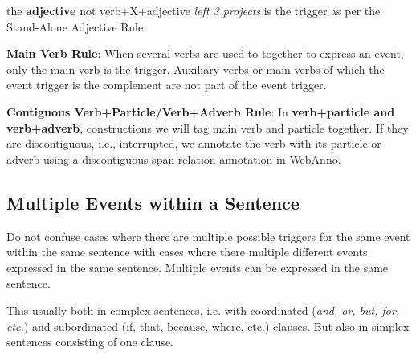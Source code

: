 \begin{exe}
    \ex {}
        \expl the \textbf{adjective}  not verb+X+adjective \textit{left 3 projects} is the trigger as per the Stand-Alone Adjective Rule.
\end{exe}

\noindent\textbf{Main Verb Rule}: When several verbs are used to together to express an event, only the main verb is the trigger. Auxiliary verbs or main verbs of which the event trigger is the complement are not part of the event trigger.
\begin{exe}
    \ex {}
    \ex {}
    \ex {}
    \ex {}
\end{exe}

\noindent\textbf{Contiguous Verb+Particle/Verb+Adverb Rule}:
In \textbf{verb+particle and verb+adverb}, constructions we will tag main verb and particle together.
If they are discontiguous, i.e., interrupted, we annotate the verb with its particle or adverb using a discontiguous span relation annotation in WebAnno.

\begin{exe}
    \ex {}
    \ex {}
    \ex {}
    \ex {}
\end{exe}

\subsection{Multiple Events within a Sentence}
Do not confuse cases where there are multiple possible triggers for the same event within the same sentence with cases where there multiple different events expressed in the same sentence.
Multiple events can be expressed in the same sentence.

This usually both in complex sentences, i.e. with coordinated (\textit{and, or, but, for, etc.}) and subordinated (if, that, because, where, etc.) clauses.
But also in simplex sentences consisting of one clause.

\begin{exe}
    \ex {}
    \ex {}
\end{exe}

